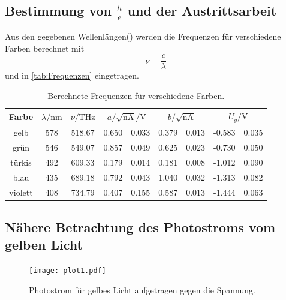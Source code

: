 \subsection{Bestimmung von $\frac{h}{e}$ und der Austrittsarbeit} %
\label{sub:Austrittsarbeit}


Aus den gegebenen Wellenlängen(\cite[80]{V500}) werden die Frequenzen für verschiedene Farben berechnet mit
\begin{equation}
  \nu = \frac{c}{\lambda}
\end{equation} 
und in \autoref{tab:Frequenzen} eingetragen.
\begin{table}[H]
  \centering
  \caption{Berechnete Frequenzen für verschiedene Farben.}
  \label{tab:Frequenzen}
  \begin{tabular}{c S[table-format=3.0] S[table-format=3.2] S@{${}\pm{}$} S S@{${}\pm{}$} S S[table-format=3.3]@{${}\pm{}$} S }
  \toprule
  {Farbe} & {$\lambda / \si{\nano\metre}$} & {$\nu / \si{\tera\hertz}$} & &  &  \\
  \midrule
    gelb    & 578 & 518.67 & 0.650 & 0.033 & 0.379 & 0.013 & -0.583 & 0.035 \\
    grün    & 546 & 549.07 & 0.857 & 0.049 & 0.625 & 0.023 & -0.730 & 0.050 \\
    türkis  & 492 & 609.33 & 0.179 & 0.014 & 0.181 & 0.008 & -1.012 & 0.090 \\
    blau    & 435 & 689.18 & 0.792 & 0.043 & 1.040 & 0.032 & -1.313 & 0.082 \\
    violett & 408 & 734.79 & 0.407 & 0.155 & 0.587 & 0.013 & -1.444 & 0.063 \\
  \bottomrule
  \end{tabular}
\end{table}



\subsection{Nähere Betrachtung des Photostroms vom gelben Licht} %
\label{sub:Nähere Betrachtung des Photostroms vom gelben Licht}

\begin{figure}
  \centering
  \texttt{[image: plot1.pdf]}
  \caption{Photostrom für gelbes Licht aufgetragen gegen die Spannung.}
  \label{fig:plot1}
\end{figure}

